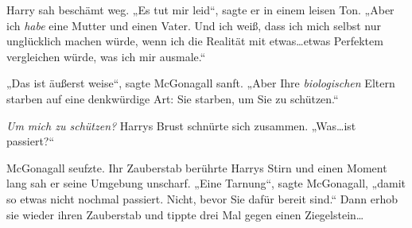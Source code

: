 Harry sah beschämt weg. „Es tut mir leid“, sagte er in einem leisen Ton. „Aber ich \emph{habe} eine Mutter und einen Vater. Und ich weiß, dass ich mich selbst nur unglücklich machen würde, wenn ich die Realität mit etwas…etwas Perfektem vergleichen würde, was ich mir ausmale.“

„Das ist äußerst weise“, sagte McGonagall sanft. „Aber Ihre \emph{biologischen} Eltern starben auf eine denkwürdige Art: Sie starben, um Sie zu schützen.“

\emph{Um mich zu schützen?} Harrys Brust schnürte sich zusammen. „Was…ist passiert?“

McGonagall seufzte. Ihr Zauberstab berührte Harrys Stirn und einen Moment lang sah er seine Umgebung unscharf. „Eine Tarnung“, sagte McGonagall, „damit so etwas nicht nochmal passiert. Nicht, bevor Sie dafür bereit sind.“ Dann erhob sie wieder ihren Zauberstab und tippte drei Mal gegen einen Ziegelstein…

